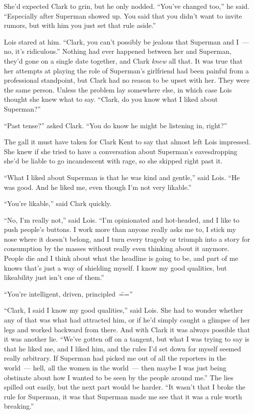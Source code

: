 \documentclass[ebook,12pt]{memoir}
\begin{document}
She'd expected Clark to grin, but he only nodded. ``You've changed
too,'' he said. ``Especially after Superman showed up. You said that you
didn't want to invite rumors, but with him you just set that rule
aside.''

Lois stared at him. ``Clark, you can't possibly be jealous that Superman
and I~--- no, it's ridiculous.'' Nothing had ever happened between her
and Superman, they'd gone on a single date together, and Clark
\emph{knew} all that. It was true that her attempts at playing the role
of Superman's girlfriend had been painful from a professional
standpoint, but Clark had no reason to be upset with her. They were the
same person. Unless the problem lay somewhere else, in which case Lois
thought she knew what to say. ``Clark, do you know what I liked about
Superman?''

``Past tense?'' asked Clark. ``You do know he might be listening in,
right?''

The gall it must have taken for Clark Kent to say that almost left Lois
impressed. She knew if she tried to have a conversation about Superman's
eavesdropping she'd be liable to go incandescent with rage, so she
skipped right past it.

``What I liked about Superman is that he was kind and gentle,'' said
Lois. ``He was good. And he liked me, even though I'm not very
likable.''

``You're likable,'' said Clark quickly.

``No, I'm really not,'' said Lois. ``I'm opinionated and hot‐headed, and
I like to push people's buttons. I work more than anyone really asks me
to, I stick my nose where it doesn't belong, and I turn every tragedy or
triumph into a story for consumption by the masses without really even
thinking about it anymore. People die and I think about what the
headline is going to be, and part of me knows that's just a way of
shielding myself. I know my good qualities, but likeability just isn't
one of them.''

``You're intelligent, driven, principled~\===''

``Clark, I said I know my good qualities,'' said Lois. She had to wonder
whether any of that was what had attracted him, or if he'd simply caught
a glimpse of her legs and worked backward from there. And with Clark it
was always possible that it was another lie. ``We've gotten off on a
tangent, but what I was trying to say is that he liked me, and I liked
him, and the rules I'd set down for myself seemed really arbitrary. If
Superman had picked me out of all the reporters in the world~--- hell,
all the women in the world~--- then maybe I was just being obstinate
about how I wanted to be seen by the people around me.'' The lies
spilled out easily, but the next part would be harder. ``It wasn't that
I broke the rule for Superman, it was that Superman made me see that it
was a rule worth breaking.''
\end{document}
